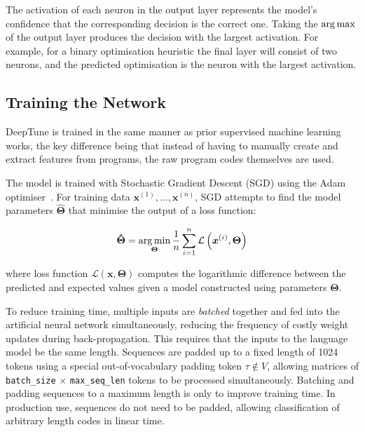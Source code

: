 The activation of each neuron in the output layer represents the model's confidence that the corresponding decision is the correct one. Taking the $\operatorname*{arg\,max}$ of the output layer produces the decision with the largest activation. For example, for a binary optimisation heuristic the final layer will consist of two neurons, and the predicted optimisation is the neuron with the largest activation.


\subsection{Training the Network}

DeepTune is trained in the same manner as prior supervised machine learning works, the key difference being that instead of having to manually create and extract features from programs, the raw program codes themselves are used.

The model is trained with Stochastic Gradient Descent (SGD) using the Adam optimiser~\cite{Kingma2015}. For training data $\bm{x}^{(1)}, \ldots, \bm{x}^{(n)}$, SGD attempts to find the model parameters $\bm{\hat{\Theta}}$ that minimise the output of a loss function:

\begin{equation}
\bm{\hat{\Theta}} = \operatorname*{arg\,min}_{\bm{\Theta}} \frac{1}{n} \sum_{i=1}^{n} \mathcal{L} \left( \bm{x}^{(i)}, \bm{\Theta} \right)
\end{equation}

where loss function $\mathcal{L} \left(\bm{x}, \bm{\Theta} \right)$ computes the logarithmic difference between the predicted and expected values given a model constructed using parameters $\bm{\Theta}$.

To reduce training time, multiple inputs are \emph{batched} together and fed into the artificial neural network simultaneously, reducing the frequency of costly weight updates during back-propagation. This requires that the inputs to the language model be the same length. Sequences are padded up to a fixed length of 1024 tokens using a special out-of-vocabulary padding token $\tau \not\in V$, allowing matrices of \texttt{batch\_size} $\times$ \texttt{max\_seq\_len} tokens to be processed simultaneously. Batching and padding sequences to a maximum length is only to improve training time. In production use, sequences do not need to be padded, allowing classification of arbitrary length codes in linear time.
